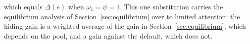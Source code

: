 which equals $\Delta(e)$ when $\omega_1=\psi=1$. This one substitution carries the equilibrium analysis of Section~\ref{sec:equilibrium} over to limited attention: the hiding gain is a weighted average of the gain in Section~\ref{sec:equilibrium}, which depends on the pool, and a gain against the default, which does not.

